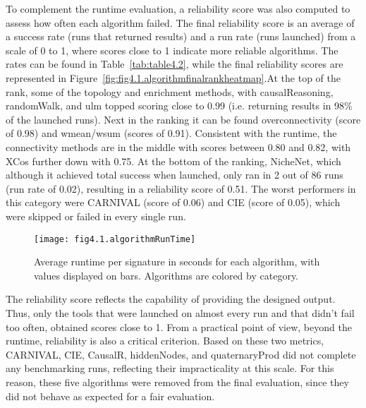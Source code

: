To complement the runtime evaluation, a reliability score was also computed to assess how often each algorithm failed. The final reliability score is an average of a success rate (runs that returned results) and a run rate (runs launched) from a scale of 0 to 1, where scores close to 1 indicate more reliable algorithms. The rates can be found in Table~\ref{tab:table4.2}, while the final reliability scores are represented in Figure~\ref{fig:fig4.1.algorithmfinalrankheatmap}.At the top of the rank, some of the topology and enrichment methods, with  causalReasoning, randomWalk, and ulm topped scoring close to 0.99 (i.e. returning results in 98\% of the launched runs). Next in the ranking it can be found overconnectivity (score of 0.98) and wmean/wsum (scores of 0.91). Consistent with the runtime, the connectivity methods are in the middle with scores between 0.80 and 0.82, with XCos further down with 0.75. At the bottom of the ranking, NicheNet, which although it achieved total success when launched, only ran in 2 out of 86 runs (run rate of 0.02), resulting in a reliability score of 0.51. The worst performers in this category were CARNIVAL (score of 0.06) and CIE (score of 0.05), which were skipped or failed in every single run. 

\begin{figure}[htbp]
    \centering
    \texttt{[image: fig4.1.algorithmRunTime]}
    \caption[Runtime per signtures.]{Average runtime per signature in seconds for each algorithm, with values displayed on bars. Algorithms are colored by category.}
    \label{fig:fig4.1.algorithmRunTime}
\end{figure}

The reliability score reflects the capability of providing the designed output. Thus, only the tools that were launched on almost every run and that didn't fail too often, obtained scores close to 1. From a practical point of view, beyond the runtime, reliability is also a critical criterion. Based on these two metrics, CARNIVAL, CIE, CausalR, hiddenNodes, and quaternaryProd did not complete any benchmarking runs, reflecting their impracticality at this scale. For this reason, these five algorithms were removed from the final evaluation, since they did not behave as expected for a fair evaluation. 

